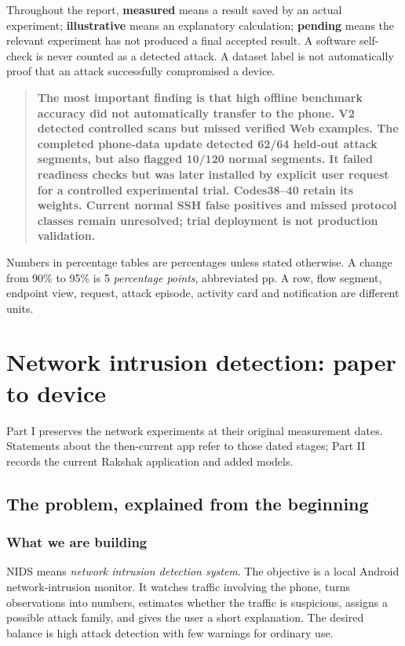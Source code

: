 \documentclass[11pt,a4paper,oneside]{report}
\newcommand{\important}[1]{\begin{quote}\color{blue!45!black}\textbf{#1}\end{quote}}
\begin{document}
Throughout the report, \textbf{measured} means a result saved by an actual experiment; \textbf{illustrative} means an explanatory calculation; \textbf{pending} means the relevant experiment has not produced a final accepted result. A software self-check is never counted as a detected attack. A dataset label is not automatically proof that an attack successfully compromised a device.

\important{The most important finding is that high offline benchmark accuracy did not automatically transfer to the phone. V2 detected controlled scans but missed verified Web examples. The completed phone-data update detected 62/64 held-out attack segments, but also flagged 10/120 normal segments. It failed readiness checks but was later installed by explicit user request for a controlled experimental trial. Codes38--40 retain its weights. Current normal SSH false positives and missed protocol classes remain unresolved; trial deployment is not production validation.}

Numbers in percentage tables are percentages unless stated otherwise. A change from 90\% to 95\% is 5 \emph{percentage points}, abbreviated pp. A row, flow segment, endpoint view, request, attack episode, activity card and notification are different units.
\tableofcontents\clearpage
{}

\part{Network intrusion detection: paper to device}
Part I preserves the network experiments at their original measurement dates. Statements about the then-current app refer to those dated stages; Part II records the current Rakshak application and added models.

\chapter{The problem, explained from the beginning}
\section{What we are building}
NIDS means \emph{network intrusion detection system}. The objective is a local Android network-intrusion monitor. It watches traffic involving the phone, turns observations into numbers, estimates whether the traffic is suspicious, assigns a possible attack family, and gives the user a short explanation. The desired balance is high attack detection with few warnings for ordinary use.
\end{document}
